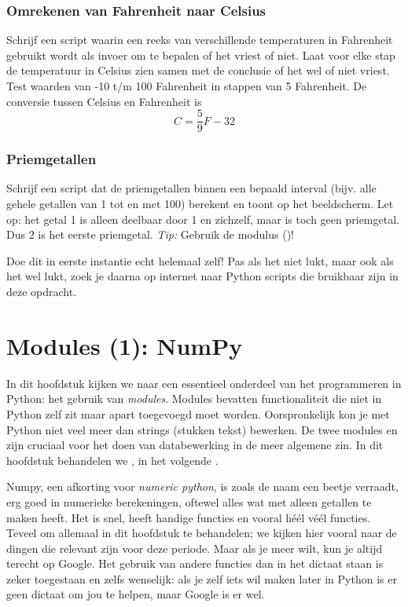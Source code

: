\documentclass[a4paper,11pt, fleqn]{article}
\newcommand{\ditwc}{Naam van het huidige werkcollege}
\begin{document}
\subsubsection{Omrekenen van Fahrenheit naar Celsius}
Schrijf een script waarin een reeks van verschillende temperaturen in Fahrenheit gebruikt wordt als invoer om te bepalen of het vriest of niet. Laat voor elke stap de temperatuur in Celsius zien samen met de conclusie of het wel of niet vriest. Test waarden van -10 t/m 100 Fahrenheit in stappen van 5 Fahrenheit. De conversie tussen Celsius en Fahrenheit is
\begin{equation}
C = \frac{5}{9}F - 32
\end{equation}

\subsubsection{Priemgetallen}
Schrijf een script dat de priemgetallen binnen een bepaald interval (bijv. alle gehele getallen van 1 tot en met 100) berekent en toont op het beeldscherm. Let op: het getal 1 is alleen deelbaar door 1 en zichzelf, maar is toch geen priemgetal. Dus 2 is het eerste priemgetal. \textit{Tip:} Gebruik de modulus (\pythoninline{\%})!

Doe dit in eerste instantie echt helemaal zelf! Pas als het niet lukt, maar ook als het wel lukt, zoek je daarna op internet naar Python scripts die bruikbaar zijn in deze opdracht. 

\clearpage
\renewcommand{\ditwc}{Modules (1): NumPy}
\section[Modules (1): NumPy]{\ditwc}
In dit hoofdstuk kijken we naar een essentieel onderdeel van het programmeren in Python: het gebruik van {\it modules}. Modules bevatten functionaliteit die niet in Python zelf zit maar apart toegevoegd moet worden. Oorspronkelijk kon je met Python niet veel meer dan strings (stukken tekst) bewerken. De twee modules  en  zijn cruciaal voor het doen van databewerking in de meer algemene zin. In dit hoofdstuk behandelen we , in het volgende .

Numpy, een afkorting voor {\it numeric python}, is zoals de naam een beetje verraadt, erg goed in numerieke berekeningen, oftewel alles wat met alleen getallen te maken heeft. Het is snel, heeft handige functies en vooral h\'e\'el v\'e\'el functies. Teveel om allemaal in dit hoofdstuk te behandelen; we kijken hier vooral naar de dingen die relevant zijn voor deze periode. Maar als je meer wilt, kun je altijd terecht op Google. Het gebruik van andere functies dan in het dictaat staan is zeker toegestaan en zelfs wenselijk: als je zelf iets wil maken later in Python is er geen dictaat om jou te helpen, maar Google is er wel.
\end{document}
